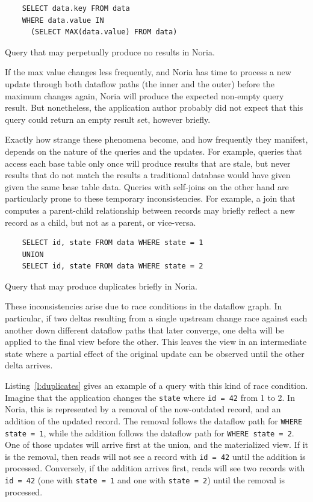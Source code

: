 \begin{listing}[h]
  \begin{verbatim}
    SELECT data.key FROM data
    WHERE data.value IN
      (SELECT MAX(data.value) FROM data)
  \end{verbatim}
  \caption{Query that may perpetually produce no results in Noria.}
  \label{l:always-wrong}
\end{listing}

If the max value changes less frequently, and Noria has time to process a new
update through both dataflow paths (the inner and the outer) before the maximum
changes again, Noria will produce the expected non-empty query result. But
nonetheless, the application author probably did not expect that this query
could return an empty result set, however briefly.

Exactly how strange these phenomena become, and how frequently they manifest,
depends on the nature of the queries and the updates. For example, queries that
access each base table only once will produce results that are stale, but never
results that do not match the results a traditional database would have given
given the same base table data. Queries with self-joins on the other hand are
particularly prone to these temporary inconsistencies. For example, a join that
computes a parent-child relationship between records may briefly reflect a new
record as a child, but not as a parent, or vice-versa.

\begin{listing}[h]
  \begin{verbatim}
    SELECT id, state FROM data WHERE state = 1
    UNION
    SELECT id, state FROM data WHERE state = 2
  \end{verbatim}
  \caption{Query that may produce duplicates briefly in Noria.}
  \label{l:duplicates}
\end{listing}

These inconsistencies arise due to race conditions in the dataflow graph. In
particular, if two deltas resulting from a single upstream change race against
each another down different dataflow paths that later converge, one delta will
be applied to the final view before the other. This leaves the view in an
intermediate state where a partial effect of the original update can be observed
until the other delta arrives.

Listing~\vref{l:duplicates} gives an example of a query with this kind of race
condition. Imagine that the application changes the \texttt{state} where
\texttt{id = 42} from 1 to 2. In Noria, this is represented by a removal of the
now-outdated record, and an addition of the updated record. The removal follows
the dataflow path for \texttt{WHERE state = 1}, while the addition follows the
dataflow path for \texttt{WHERE state = 2}. One of those updates will arrive
first at the union, and the materialized view. If it is the removal, then reads
will not see a record with \texttt{id = 42} until the addition is processed.
Conversely, if the addition arrives first, reads will see two records with
\texttt{id = 42} (one with \texttt{state = 1} and one with \texttt{state = 2})
until the removal is processed.

